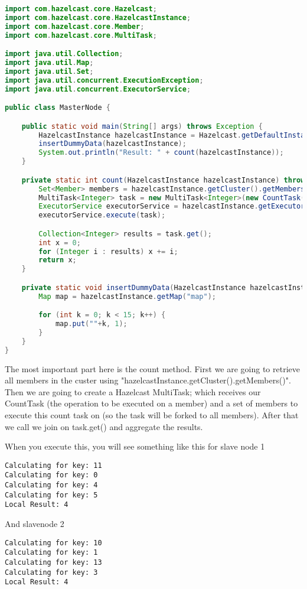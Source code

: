 \begin{lstlisting}[language=java]
import com.hazelcast.core.Hazelcast;
import com.hazelcast.core.HazelcastInstance;
import com.hazelcast.core.Member;
import com.hazelcast.core.MultiTask;

import java.util.Collection;
import java.util.Map;
import java.util.Set;
import java.util.concurrent.ExecutionException;
import java.util.concurrent.ExecutorService;

public class MasterNode {

    public static void main(String[] args) throws Exception {
        HazelcastInstance hazelcastInstance = Hazelcast.getDefaultInstance();
        insertDummyData(hazelcastInstance);
        System.out.println("Result: " + count(hazelcastInstance));
    }

    private static int count(HazelcastInstance hazelcastInstance) throws Exception {
        Set<Member> members = hazelcastInstance.getCluster().getMembers();
        MultiTask<Integer> task = new MultiTask<Integer>(new CountTask(), members);
        ExecutorService executorService = hazelcastInstance.getExecutorService();
        executorService.execute(task);

        Collection<Integer> results = task.get();
        int x = 0;
        for (Integer i : results) x += i;
        return x;
    }

    private static void insertDummyData(HazelcastInstance hazelcastInstance) {
        Map map = hazelcastInstance.getMap("map");

        for (int k = 0; k < 15; k++) {
            map.put(""+k, 1);
        }
    }
}
\end{lstlisting}
The most important part here is the count method. First we are going to retrieve all members in the custer using "hazelcastInstance.getCluster().getMembers()". Then we are going to create a Hazelcast MultiTask; which receives our CountTask (the operation to be executed on a member) and a set of members to execute this count task on (so the task will be forked to all members). After that we call we join on task.get() and aggregate the results.

When you execute this, you will see something like this for slave node 1
\begin{verbatim}
Calculating for key: 11
Calculating for key: 0
Calculating for key: 4
Calculating for key: 5
Local Result: 4
\end{verbatim}

And slavenode 2
\begin{verbatim}
Calculating for key: 10
Calculating for key: 1
Calculating for key: 13
Calculating for key: 3
Local Result: 4
\end{verbatim}

